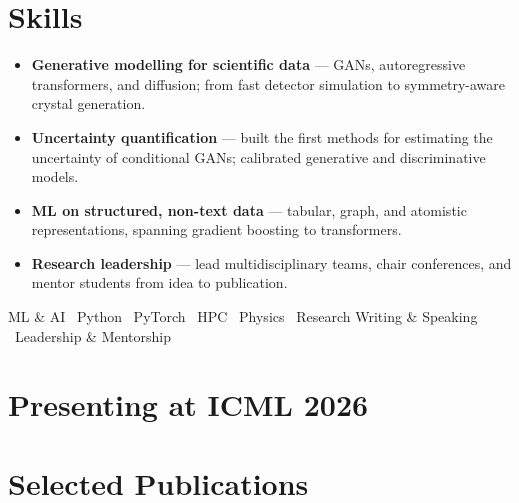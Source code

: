 \documentclass[11pt,a4paper]{article}
\begin{document}
\section{Skills}
\begin{itemize}
  \item \textbf{Generative modelling for scientific data} --- GANs, autoregressive transformers, and diffusion; from fast detector simulation to symmetry-aware crystal generation.
  \item \textbf{Uncertainty quantification} --- built the first methods for estimating the uncertainty of conditional GANs; calibrated generative and discriminative models.
  \item \textbf{ML on structured, non-text data} --- tabular, graph, and atomistic representations, spanning gradient boosting to transformers.
  \item \textbf{Research leadership} --- lead multidisciplinary teams, chair conferences, and mentor students from idea to publication.
\end{itemize}
{\small\centering ML \& AI \textbullet\ Python \textbullet\ PyTorch \textbullet\ HPC \textbullet\ Physics \textbullet\ Research Writing \& Speaking \textbullet\ Leadership \& Mentorship\par}

\nocite{*}
\section{Presenting at ICML 2026}
\printbibliography[filter=cvicml,heading=none,resetnumbers=true]

\section{Selected Publications}
\printbibliography[filter=cvselected,heading=none,resetnumbers=true]
\end{document}

